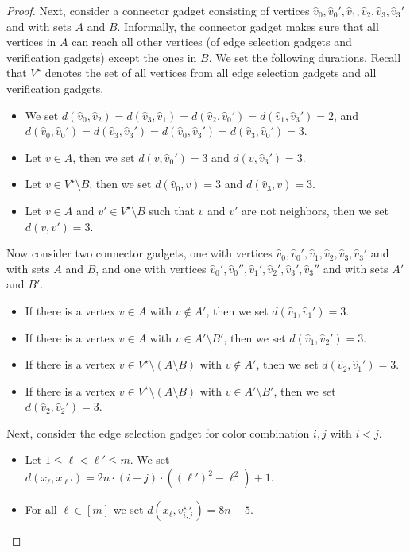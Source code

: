 \documentclass[a4paper,UKenglish,cleveref, autoref, thm-restate, anonymous]{lipics-v2021}
\begin{document}
\begin{proof}
Next, consider a connector gadget consisting of vertices $\hat{v}_0,\hat{v}_0',\hat{v}_1,\hat{v}_2,\hat{v}_3,\hat{v}_3'$ and with sets $A$ and $B$. Informally, the connector gadget makes sure that all vertices in $A$ can reach all other vertices (of edge selection gadgets and verification gadgets) except the ones in $B$. We set the following durations. Recall that $V^\star$ denotes the set of all vertices from all edge selection gadgets and all verification gadgets.
\begin{itemize}
    \item We set $d(\hat{v}_0,\hat{v}_2)=d(\hat{v}_3,\hat{v}_1)=d(\hat{v}_2,\hat{v}_0')=d(\hat{v}_1,\hat{v}_3')=2$, and $d(\hat{v}_0,\hat{v}_0')=d(\hat{v}_3,\hat{v}_3')=d(\hat{v}_0,\hat{v}_3')=d(\hat{v}_3,\hat{v}_0')=3$.
    \item Let $v\in A$, then we set $d(v,\hat{v}_0')=3$ and $d(v,\hat{v}_3')=3$.
    \item Let $v\in V^\star\setminus B$, then we set $d(\hat{v}_0,v)=3$ and $d(\hat{v}_3,v)=3$.
    \item Let $v\in A$ and $v'\in V^\star\setminus B$ such that $v$ and $v'$ are not neighbors, then we set $d(v,v')=3$.
\end{itemize}
Now consider two connector gadgets, one with vertices $\hat{v}_0,\hat{v}_0',\hat{v}_1,\hat{v}_2,\hat{v}_3,\hat{v}_3'$ and with sets $A$ and $B$, and one with vertices $\hat{v}_0',\hat{v}_0'',\hat{v}_1',\hat{v}_2',\hat{v}_3',\hat{v}_3''$ and with sets $A'$ and $B'$.
\begin{itemize}
    \item If there is a vertex $v\in A$ with $v\notin A'$, then we set $d(\hat{v}_1,\hat{v}_1')=3$.
    \item If there is a vertex $v\in A$ with $v\in A'\setminus B'$, then we set $d(\hat{v}_1,\hat{v}_2')=3$.
    \item If there is a vertex $v\in V^\star\setminus (A\setminus B)$ with $v\notin A'$, then we set $d(\hat{v}_2,\hat{v}_1')=3$.    
    \item If there is a vertex $v\in V^\star\setminus (A\setminus B)$ with $v\in A'\setminus B'$, then we set $d(\hat{v}_2,\hat{v}_2')=3$.
\end{itemize}

Next, consider the edge selection gadget for color combination $i,j$ with $i<j$.
\begin{itemize}
    \item Let $1\le \ell<\ell'\le m$. We set $d(x_\ell,x_{\ell'})=2n\cdot (i+j)\cdot((\ell')^2-\ell^2)+1$.
    \item For all $\ell\in[m]$ we set $d(x_\ell,v_{i,j}^{\star\star})=8n+5$.
\end{itemize}


\end{proof}
\end{document}
